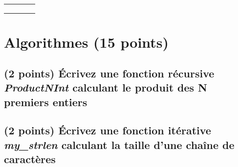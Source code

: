 \documentclass[11pt,a4paper]{article}
\begin{document}
\begin{table}[h!]
\begin{minipage}{0.4\textwidth}
\begin{tabular}{| C{1cm} | C{1cm} | C{1cm} | C{1cm} |}
                         &  &  &    \\
        \hline
         &  &  &  \\
         &  &  &  \\
         &  &  &  \\
        \hline
    \end{tabular}
  \end{minipage}
\end{table}


\bigskip

\vfillLast
\clearpage

\section{Algorithmes (15 points)}

\subsection{(2 points) \'Ecrivez une fonction récursive \og \textit{ProductNInt} \fg{} calculant le produit des N premiers entiers }

\bigskip

\begin{center}
\end{center}

\bigskip


\subsection{(2 points) \'Ecrivez une fonction itérative \og \textit{my\_strlen} \fg{} calculant la taille d'une chaîne de caractères }

\bigskip

\begin{center}
\end{center}
\end{document}
